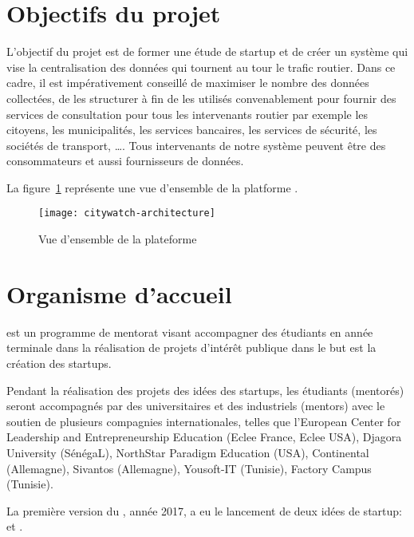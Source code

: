 \section{Objectifs du projet}

L'objectif du projet  est de former une étude de startup
et de créer un système qui vise la centralisation des données qui tournent au
tour le trafic routier. Dans ce cadre, il est impérativement conseillé de
maximiser le nombre des données collectées, de les structurer à fin de les
utilisés convenablement pour fournir des services de consultation pour tous les
intervenants routier par exemple les citoyens, les municipalités, les services
bancaires, les services de sécurité, les sociétés de transport, \ldots.  Tous
intervenants de notre système peuvent être des consommateurs et aussi
fournisseurs de données.

La figure~\ref{fig:citywatch-architecture} représente une vue d'ensemble de la
platforme .

\begin{figure}[!h]
    \centering
    \texttt{[image: citywatch-architecture]}
    \caption{Vue d'ensemble de la plateforme }
\label{fig:citywatch-architecture}
\end{figure}

\section{Organisme d'accueil }

 est un programme de mentorat visant accompagner des
étudiants en année terminale dans la réalisation de projets d'intérêt publique
dans le but est la création des startups.

Pendant la réalisation des projets des idées des startups, les étudiants
(mentorés) seront accompagnés par des universitaires et des industriels
(mentors) avec le soutien de plusieurs compagnies internationales, telles que
l'European Center for Leadership and Entrepreneurship Education (Eclee France,
Eclee USA), Djagora University (SénégaL), NorthStar Paradigm Education (USA),
Continental (Allemagne), Sivantos (Allemagne), Yousoft-IT (Tunisie), Factory
Campus (Tunisie).

La première version du , année 2017, a eu le
lancement de deux idées de startup:  et .

